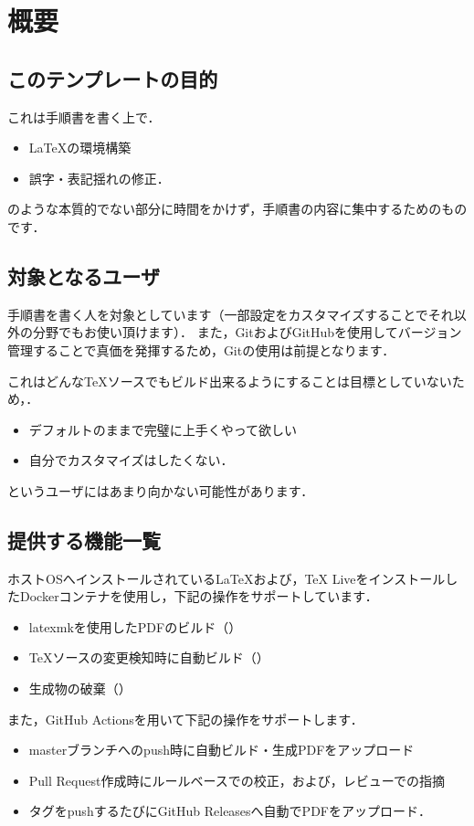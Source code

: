 \documentclass[main]{subfiles}
\begin{document}
\section{概要}

\subsection{このテンプレートの目的}

これは手順書を書く上で．

\begin{itemize}
    \item LaTeXの環境構築
    \item 誤字・表記揺れの修正．
\end{itemize}

のような本質的でない部分に時間をかけず，手順書の内容に集中するためのものです．

\subsection{対象となるユーザ}
手順書を書く人を対象としています（一部設定をカスタマイズすることでそれ以外の分野でもお使い頂けます）．
また，GitおよびGitHubを使用してバージョン管理することで真価を発揮するため，Gitの使用は前提となります．


これはどんなTeXソースでもビルド出来るようにすることは目標としていないため，．

\begin{itemize}
    \item デフォルトのままで完璧に上手くやって欲しい
    \item 自分でカスタマイズはしたくない．
\end{itemize}

というユーザにはあまり向かない可能性があります．

\subsection{提供する機能一覧}

ホストOSへインストールされているLaTeXおよび，TeX LiveをインストールしたDockerコンテナを使用し，下記の操作をサポートしています．

\begin{itemize}
    \item latexmkを使用したPDFのビルド（）
    \item TeXソースの変更検知時に自動ビルド（）
    \item 生成物の破棄（）
\end{itemize}

また，GitHub Actionsを用いて下記の操作をサポートします．

\begin{itemize}
    \item masterブランチへのpush時に自動ビルド・生成PDFをアップロード
    \item Pull Request作成時にルールベースでの校正，および，レビューでの指摘
    \item タグをpushするたびにGitHub Releasesへ自動でPDFをアップロード．
\end{itemize}
\end{document}
